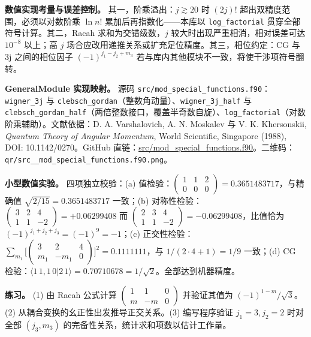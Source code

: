\documentclass[
]{ctexbook}
\begin{document}
\textbf{数值实现考量与误差控制。} 其一，阶乘溢出：\(j\gtrsim 20\) 时
\((2j)!\) 超出双精度范围，必须以对数阶乘 \(\ln n!\)
累加后再指数化------本库以 \texttt{log\_factorial}
贯穿全部符号计算。其二，Racah 求和为交错级数，\(j\)
较大时出现严重相消，相对误差可达 \(10^{-8}\) 以上；高 \(j\)
场合应改用递推关系或扩充足位精度。其三，相位约定：CG 与 3j
之间的相位因子 \((-1)^{j_1-j_2+m_3}\)
若与库内其他模块不一致，将使干涉项符号翻转。

\textbf{GeneralModule 实现映射。} 源码
\texttt{src/mod\_special\_functions.f90}：\texttt{wigner\_3j} 与
\texttt{clebsch\_gordan}（整数角动量）、\texttt{wigner\_3j\_half} 与
\texttt{clebsch\_gordan\_half}（两倍整数接口，覆盖半奇数自旋）、\texttt{log\_factorial}（对数阶乘辅助）。文献依据：D.
A. Varshalovich, A. N. Moskalev 与 V. K. Khersonskii, \emph{Quantum
Theory of Angular Momentum}, World Scientific, Singapore (1988), DOI:
10.1142/0270。GitHub
直链：\href{https://github.com/l1Ha/QuantumGeneralModule/blob/main/src/mod_special_functions.f90}{src/mod\_special\_functions.f90}。二维码：\texttt{qr/src\_\_mod\_special\_functions.f90.png}。

\textbf{小型数值实验。} 四项独立校验：(a)
值检验：\(\begin{pmatrix}1&1&2\\0&0&0\end{pmatrix}=0.3651483717\)，与精确值
\(\sqrt{2/15}=0.3651483717\) 一致；(b)
对称性检验：\(\begin{pmatrix}3&2&4\\1&1&-2\end{pmatrix}=+0.06299408\) 而
\(\begin{pmatrix}2&3&4\\1&1&-2\end{pmatrix}=-0.06299408\)，比值恰为
\((-1)^{j_1+j_2+j_3}=(-1)^{9}=-1\)；(c)
正交性检验：\(\sum_{m_1}\bigl[\begin{pmatrix}3&2&4\\m_1&-m_1&0\end{pmatrix}\bigr]^{2}=0.1111111\)，与
\(1/(2\cdot4+1)=1/9\) 一致；(d) CG
检验：\(\langle 1\,1,1\,0|2\,1\rangle=0.70710678=1/\sqrt2\)。全部达到机器精度。

\textbf{练习。} (1) 由 Racah 公式计算
\(\begin{pmatrix}1&1&0\\m&-m&0\end{pmatrix}\) 并验证其值为
\((-1)^{1-m}/\sqrt3\)。(2) 从耦合变换的幺正性出发推导正交关系。(3)
编写程序验证 \(j_1=3,j_2=2\) 时对全部 \((j_3,m_3)\)
的完备性关系，统计求和项数以估计工作量。
\end{document}
